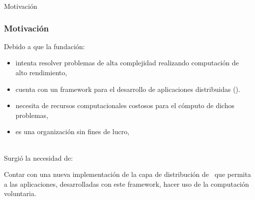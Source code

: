 \begin{subsection}{Motivación}

	\begin{frame}\frametitle{Motivación}
		Debido a que la fundación:
		
		\begin{itemize}
		\item intenta resolver problemas de alta complejidad realizando computación de alto rendimiento,
		\item cuenta con un framework para el desarrollo de aplicaciones distribuidas (\fud ).
		\item necesita de recursos computacionales costosos para el cómputo de dichos problemas,
		\item es una organización sin fines de lucro,
		\end{itemize}
		
		\pause
		\ \\Surgió la necesidad de:
		
		\begin{block}{}
			Contar con una nueva implementación de la capa de distribución de \fud \ que permita a las aplicaciones, desarrolladas
			con este framework, hacer uso de la computación voluntaria.
		\end{block}
	\end{frame}
	
\end{subsection}

